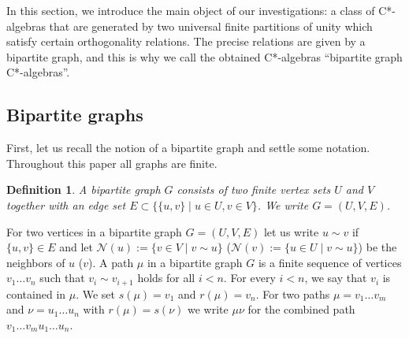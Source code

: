 \documentclass[a4paper]{amsart}
\newtheorem{definition}[thm]{Definition}
\begin{document}
In this section, we introduce the main object of our investigations: a class of C*-algebras that are generated by two universal finite partitions of unity which satisfy certain orthogonality relations. The precise relations are given by a bipartite graph, and this is why we call the obtained C*-algebras ``bipartite graph C*-algebras''. 

\subsection{Bipartite graphs}

First, let us recall the notion of a bipartite graph and settle some notation. Throughout this paper all graphs are finite.

\begin{definition}
    A bipartite graph $G$ consists of two finite vertex sets $U$ and $V$ together with an edge set $E \subset \{\{u,v\}\mid u \in U, v \in V\}$. We write $G = (U, V, E)$.
\end{definition}
 
For two vertices in a bipartite graph $G = (U, V, E)$ let us write $u \sim v$ if $\{u,v\} \in E$ and let $\mathcal{N}(u) := \{v \in V\mid v \sim u\}$ ($\mathcal{N}(v) := \{u \in U\mid v \sim u\}$) be the neighbors of $u$ ($v$). A path $\mu$ in a bipartite graph $G$ is a finite sequence of vertices $v_1 \dots v_n$ such that $v_i \sim v_{i+1}$ holds for all $i < n$. For every $i < n$, we say that $v_i$ is contained in $\mu$. We set $s(\mu) = v_1$ and $r(\mu) = v_n$. For two paths $\mu=v_1 \dots v_m$ and $\nu = u_1 \dots u_n$ with $r(\mu) = s(\nu)$ we write $\mu \nu$ for the combined path $v_1 \dots v_m u_1 \dots u_n$.
\end{document}
